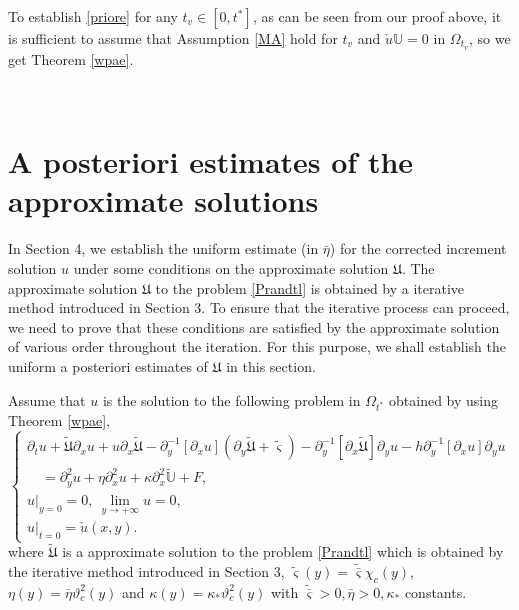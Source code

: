 \documentclass{amsart}
\numberwithin{equation}{section}
\begin{document}
To establish \eqref{priore} for any $t_{v}\in[0,t^{*}]$, as can be seen from our proof above, it is sufficient to assume that Assumption \ref{MA} hold for $t_{v}$ and $\check{u}\mathbb{U}=0$ in $\Omega_{t_{v}}$, so we get Theorem \ref{wpae}.


~~~~~~~~~~

\section{A posteriori estimates of the approximate solutions}

In Section 4, we establish the uniform estimate (in $\bar{\eta}$) for the corrected increment solution $u$ under some conditions on the approximate solution $\mathfrak{U}$. The approximate solution $\mathfrak{U}$ to the problem \eqref{Prandtl} is obtained by a iterative method introduced in Section 3. To ensure that the iterative process can proceed, we need to prove that these conditions are satisfied by the approximate solution of various order throughout the iteration. For this purpose, we shall establish the uniform a posteriori estimates of $\mathfrak{U}$ in this section.

Assume that $u$ is the solution to the following problem in $\Omega_{t^{*}}$ obtained by using Theorem \ref{wpae},
\begin{equation}\label{app'}
\begin{cases}
\partial_{t}u
+\tilde{\mathfrak{U}}\partial_{x}u+u\partial_{x}\tilde{\mathfrak{U}}
-\partial_{y}^{-1}[\partial_{x}u](\partial_{y}\tilde{\mathfrak{U}}+\tilde{\varsigma})
-\partial_{y}^{-1}[\partial_{x}\tilde{\mathfrak{U}}]\partial_{y}u
-h\partial_{y}^{-1}[\partial_{x}u]\partial_{y}u\\
\quad
=\partial_{y}^{2}u+\eta\partial_{x}^{2}u+\kappa\partial_{x}^{2}\tilde{\mathbb{U}}+F,\\
u|_{y=0}=0,~\lim\limits_{y\to+\infty} u=0,\\
u|_{t=0}=\check{u}(x,y).
\end{cases}
\end{equation}
where $\tilde{\mathfrak{U}}$ is a approximate solution to the problem \eqref{Prandtl} which is obtained by the iterative method introduced in Section 3, $\tilde{\varsigma}(y)=\tilde{\bar{\varsigma}}\chi_{c}(y)$, $\eta(y)=\bar{\eta}\vartheta_{c}^{2}(y)$ and $\kappa(y)=\kappa_{*}\vartheta_{c}^{2}(y)$ with $\tilde{\bar{\varsigma}}>0, \bar{\eta}>0, \kappa_{*}$ constants.
\end{document}
